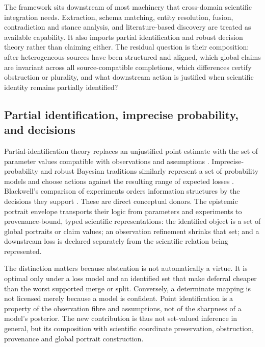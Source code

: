 The framework sits downstream of most machinery that cross-domain scientific
integration needs. Extraction, schema matching, entity resolution, fusion,
contradiction and stance analysis, and literature-based discovery are treated
as available capability. It also imports partial identification and robust
decision theory rather than claiming either. The residual question is their
composition: after heterogeneous sources have been structured and aligned,
which global claims are invariant across all source-compatible completions,
which differences certify obstruction or plurality, and what downstream action
is justified when scientific identity remains partially identified?

\subsection{Partial identification, imprecise probability, and decisions}

Partial-identification theory replaces an unjustified point estimate with the
set of parameter values compatible with observations and assumptions
\cite{manski2003partial,tamer2010partial}. Imprecise-probability and robust
Bayesian traditions similarly represent a set of probability models and
choose actions against the resulting range of expected losses
\cite{walley1991imprecise,berger1985decision}. Blackwell's comparison of
experiments orders information structures by the decisions they support
\cite{blackwell1953equivalent}. These are direct conceptual donors. The
epistemic portrait envelope transports their logic from parameters and
experiments to provenance-bound, typed scientific representations: the
identified object is a set of global portraits or claim values; an observation
refinement shrinks that set; and a downstream loss is declared separately from
the scientific relation being represented.

The distinction matters because abstention is not automatically a virtue. It
is optimal only under a loss model and an identified set that make deferral
cheaper than the worst supported merge or split. Conversely, a determinate
mapping is not licensed merely because a model is confident. Point
identification is a property of the observation fibre and assumptions, not of
the sharpness of a model's posterior. The new contribution is thus not
set-valued inference in general, but its composition with scientific
coordinate preservation, obstruction, provenance and global portrait
construction.

